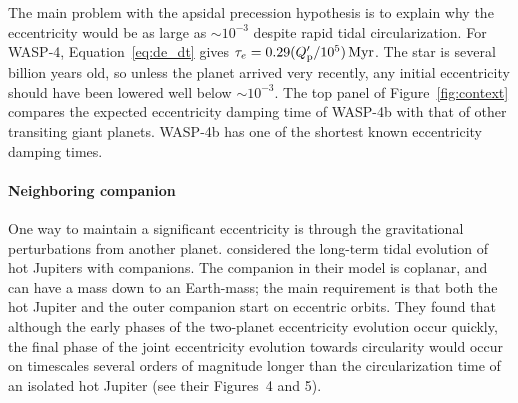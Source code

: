 \documentclass[12pt,twocolumn,tighten]{aastex62}
\begin{document}
The main problem with the apsidal precession hypothesis  is to explain why the eccentricity would be as
large as $\sim$$10^{-3}$ despite rapid tidal circularization.  For
WASP-4, Equation~\ref{eq:de_dt} gives $\tau_e = 0.29 (Q_{\rm p}'/10^5)
\, {\rm Myr}$.  The star is several billion years old, so unless the
planet arrived very recently, any initial eccentricity should have
been lowered well below $\sim$$10^{-3}$.  The top panel of
Figure~\ref{fig:context} compares the expected eccentricity damping
time of WASP-4b with that of other transiting giant planets.  WASP-4b
has one of the shortest known eccentricity damping times.

\paragraph{Neighboring companion}
One way to maintain a significant eccentricity is through the
gravitational perturbations from another planet.
\citet{mardling_long-term_2007} considered the long-term tidal
evolution of hot Jupiters with companions.  The companion in their
model is coplanar, and can have a mass down to an Earth-mass; the main
requirement is that both the hot Jupiter and the outer companion start
on eccentric orbits.  They found that although the early phases of the
two-planet eccentricity evolution occur quickly, the final phase of
the joint eccentricity evolution towards circularity would occur on
timescales several orders of magnitude longer than the circularization
time of an isolated hot Jupiter (see their Figures~4 and 5).
 
\end{document}
